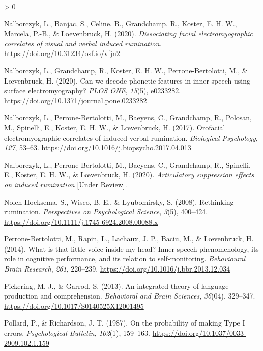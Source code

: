 \documentclass[
  english,
  man, donotrepeattitle,floatsintext]{apa6}
\newlength{\cslhangindent}
\newenvironment{CSLReferences}[2] %
 {%
  \setlength{\parindent}{0pt}
  \ifodd #1 \everypar{\setlength{\hangindent}{\cslhangindent}}\ignorespaces\fi
  \ifnum #2 > 0
  \setlength{\parskip}{#2\baselineskip}
  \fi
 }%
 {}
\begin{document}
\begin{CSLReferences}{1}{0}
\leavevmode\hypertarget{ref-nalborczyk_dissociating_2020}{}%
Nalborczyk, L., Banjac, S., Celine, B., Grandchamp, R., Koster, E. H. W., Marcela, P.-B., \& Loevenbruck, H. (2020). \emph{Dissociating facial electromyographic correlates of visual and verbal induced rumination}. \url{https://doi.org/10.31234/osf.io/vfjn2}

\leavevmode\hypertarget{ref-nalborczyk_can_2020}{}%
Nalborczyk, L., Grandchamp, R., Koster, E. H. W., Perrone-Bertolotti, M., \& Lœvenbruck, H. (2020). Can we decode phonetic features in inner speech using surface electromyography? \emph{PLOS ONE}, \emph{15}(5), e0233282. \url{https://doi.org/10.1371/journal.pone.0233282}

\leavevmode\hypertarget{ref-nalborczyk_orofacial_2017}{}%
Nalborczyk, L., Perrone-Bertolotti, M., Baeyens, C., Grandchamp, R., Polosan, M., Spinelli, E., Koster, E. H. W., \& Lœvenbruck, H. (2017). Orofacial electromyographic correlates of induced verbal rumination. \emph{Biological Psychology}, \emph{127}, 53--63. \url{https://doi.org/10.1016/j.biopsycho.2017.04.013}

\leavevmode\hypertarget{ref-nalborczyk_articulatory_2020}{}%
Nalborczyk, L., Perrone-Bertolotti, M., Baeyens, C., Grandchamp, R., Spinelli, E., Koster, E. H. W., \& Lœvenbruck, H. (2020). \emph{Articulatory suppression effects on induced rumination} {[}Under Review{]}.

\leavevmode\hypertarget{ref-Nolen-Hoeksema2008}{}%
Nolen-Hoeksema, S., Wisco, B. E., \& Lyubomirsky, S. (2008). Rethinking rumination. \emph{Perspectives on Psychological Science}, \emph{3}(5), 400--424. \url{https://doi.org/10.1111/j.1745-6924.2008.00088.x}

\leavevmode\hypertarget{ref-perrone-bertolotti_what_2014}{}%
Perrone-Bertolotti, M., Rapin, L., Lachaux, J. P., Baciu, M., \& Lœvenbruck, H. (2014). What is that little voice inside my head? {Inner} speech phenomenology, its role in cognitive performance, and its relation to self-monitoring. \emph{Behavioural Brain Research}, \emph{261}, 220--239. \url{https://doi.org/10.1016/j.bbr.2013.12.034}

\leavevmode\hypertarget{ref-pickering_integrated_2013}{}%
Pickering, M. J., \& Garrod, S. (2013). An integrated theory of language production and comprehension. \emph{Behavioral and Brain Sciences}, \emph{36}(04), 329--347. \url{https://doi.org/10.1017/S0140525X12001495}

\leavevmode\hypertarget{ref-pollard_probability_1987}{}%
Pollard, P., \& Richardson, J. T. (1987). On the probability of making {Type I} errors. \emph{Psychological Bulletin}, \emph{102}(1), 159--163. \url{https://doi.org/10.1037/0033-2909.102.1.159}


\end{CSLReferences}
\end{document}
